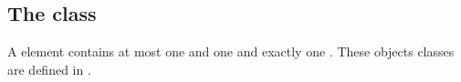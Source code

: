 %
%
%
%
%
%

\pagebreak


\subsection{The  class}
\label{transitions-class}
A \Transition element contains at most one \ListOfInputs and one \ListOfOutputs and exactly one \ListOfFunctionTerms. These objects classes are defined in .

